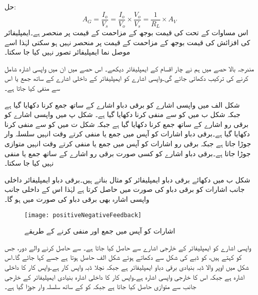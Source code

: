 حل:
\begin{equation*}
A_G=\frac{I_o}{V_s}=\frac{I_o}{V_o} \times \frac{V_o}{V_s}=\frac{1}{R_L} \times A_V
\end{equation*}
اس مساوات کے تحت  کی قیمت بوجھ کے مزاحمت  کے قیمت پر منحصر ہے۔ایمپلیفائر کی افزائش کی قیمت بوجھ کے مزاحمت کے قیمت پر منحصر نہیں ہو سکتی لہٰذا اسے موصل نما ایمپلیفائر تصور نہیں کیا جا سکتا۔ 


مندرجہ بالا حصے میں ہم نے چار اقسام کے ایمپلیفائر دیکھے۔ اس حصے میں ان میں واپسی اشارہ شامل کرنے کی ترکیب دکھائی جائے گی۔واپسی اشارے کو ایمپلیفائر کے داخلی اشارے کے ساتھ جمع یا اس سے منفی کیا جاتا ہے۔

 شکل  الف  میں واپسی اشارے  کو برقی دباو اشارے  کے ساتھ  جمع کرنا دکھایا گیا ہے جبکہ شکل  ب میں   کو  سے منفی کرنا دکھایا گیا ہے۔ شکل  پ  میں واپسی اشارے  کو برقی رو اشارے   کے ساتھ جمع کرنا دکھایا گیا ہے جبکہ شکل  ت میں  کو   سے منفی کرنا دکھایا گیا ہے۔برقی دباو اشارات کو آپس میں جمع یا منفی کرتے وقت انہیں سلسلہ وار جوڑا جاتا ہے جبکہ برقی رو اشارات کو آپس میں جمع یا منفی کرتے وقت انہیں متوازی جوڑا جاتا ہے۔برقی دباو اشارے کو کسی صورت برقی رو اشارے کے ساتھ جمع یا منفی نہیں کیا جا سکتا۔ 

شکل  ب میں دکھائے برقی دباو ایمپلیفائر کو مثال بناتے ہیں۔برقی دباو ایمپلیفائر داخلی جانب اشارات کو برقی دباو کی صورت میں حاصل کرتا ہے لہٰذا اس کے داخلی جانب واپسی اشارہ بھی برقی دباو کی صورت میں ہو گا۔
\begin{figure}
\centering
\texttt{[image: positiveNegativeFeedback]}
\caption{اشارات کو آپس میں جمع اور منفی کرنے کے طریقے}
\label{شکل_واپسی_اشارات_جمع_منفی_کے_طریقے}
\end{figure}
واپسی اشارے کو ایمپلیفائر کے خارجی اشارے سے حاصل کیا جاتا ہے۔  سے  حاصل کرنے والے دور، جس کو  کہتے ہیں، کو ڈبے کی شکل سے دکھاتے ہوئے شکل  الف حاصل ہوتا ہے جسے  کہا جائے گا۔اس شکل میں اوپر والا ڈبہ بنیادی برقی دباو ایمپلیفائر ہے جبکہ نچلا ڈبہ واپس کار ہے۔واپس کار کا داخلی اشارہ  ہے جبکہ اس کا خارجی واپسی اشارہ  ہے۔واپس کار  کا داخلی  اشارہ بنیادی ایمپلیفائر کے خارجی جانب سے   متوازی حاصل کیا جاتا ہے جبکہ  کو   کے ساتھ  سلسلہ وار جوڑا گیا ہے۔


